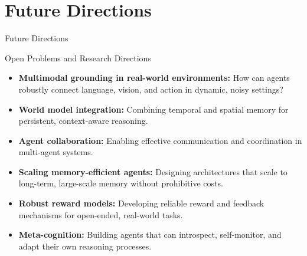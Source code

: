 \section{Future Directions}
\begin{frame}{}
  \LARGE Future Directions
\end{frame}

\begin{frame}{Open Problems and Research Directions}
  \begin{itemize}
    \item[\textcolor{red}{$\blacktriangleright$}] \textbf{Multimodal grounding in real-world environments:} How can agents robustly connect language, vision, and action in dynamic, noisy settings?
    \item[\textcolor{red}{$\blacktriangleright$}] \textbf{World model integration:} Combining temporal and spatial memory for persistent, context-aware reasoning.
    \item[\textcolor{red}{$\blacktriangleright$}] \textbf{Agent collaboration:} Enabling effective communication and coordination in multi-agent systems.
    \item[\textcolor{red}{$\blacktriangleright$}] \textbf{Scaling memory-efficient agents:} Designing architectures that scale to long-term, large-scale memory without prohibitive costs.
    \item[\textcolor{red}{$\blacktriangleright$}] \textbf{Robust reward models:} Developing reliable reward and feedback mechanisms for open-ended, real-world tasks.
    \item[\textcolor{red}{$\blacktriangleright$}] \textbf{Meta-cognition:} Building agents that can introspect, self-monitor, and adapt their own reasoning processes.
  \end{itemize}
\end{frame}
